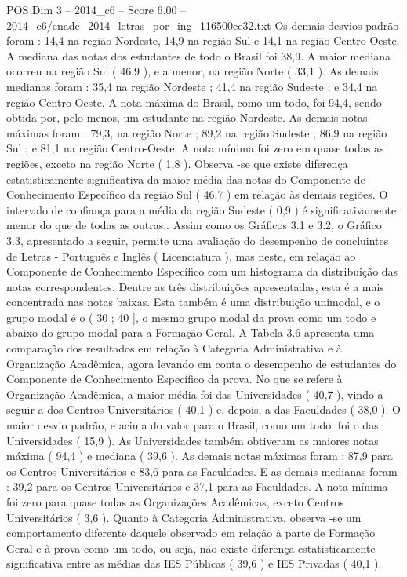 \begin{textsample}{POS Dim 3 – 2014\_c6 – Score 6.00 – 2014\_c6/enade\_2014\_letras\_por\_ing\_116500ce32.txt}
Os demais desvios padrão foram : 14,4 na região Nordeste, 14,9 na região Sul e 14,1 na região Centro-Oeste.
A mediana das notas dos estudantes de todo o Brasil foi 38,9.
A maior mediana ocorreu na região Sul ( 46,9 ), e a menor, na região Norte ( 33,1 ).
As demais medianas foram : 35,4 na região Nordeste ; 41,4 na região Sudeste ; e 34,4 na região Centro-Oeste.
A nota máxima do Brasil, como um todo, foi 94,4, sendo obtida por, pelo menos, um estudante na região Nordeste.
As demais notas máximas foram : 79,3, na região Norte ; 89,2 na região Sudeste ; 86,9 na região Sul ; e 81,1 na região Centro-Oeste.
A nota mínima foi zero em quase todas as regiões, exceto na região Norte ( 1,8 ).
Observa -se que existe diferença estatisticamente significativa da maior média das notas do Componente de Conhecimento Específico da região Sul ( 46,7 ) em relação às demais regiões.
O intervalo de confiança para a média da região Sudeste ( 0,9 ) é significativamente menor do que de todas as outras..
Assim como os Gráficos 3.1 e 3.2, o Gráfico 3.3, apresentado a seguir, permite uma avaliação do desempenho de concluintes de Letras - Português e Inglês ( Licenciatura ), mas neste, em relação ao Componente de Conhecimento Específico com um histograma da distribuição das notas correspondentes.
Dentre as três distribuições apresentadas, esta é a mais concentrada nas notas baixas.
Esta também é uma distribuição unimodal, e o grupo modal é o ( 30 ; 40 ], o mesmo grupo modal da prova como um todo e abaixo do grupo modal para a Formação Geral.
A Tabela 3.6 apresenta uma comparação dos resultados em relação à Categoria Administrativa e à Organização Acadêmica, agora levando em conta o desempenho de estudantes do Componente de Conhecimento Específico da prova.
No que se refere à Organização Acadêmica, a maior média foi das Universidades ( 40,7 ), vindo a seguir a dos Centros Universitários ( 40,1 ) e, depois, a das Faculdades ( 38,0 ).
O maior desvio padrão, e acima do valor para o Brasil, como um todo, foi o das Universidades ( 15,9 ).
As Universidades também obtiveram as maiores notas máxima ( 94,4 ) e mediana ( 39,6 ).
As demais notas máximas foram : 87,9 para os Centros Universitários e 83,6 para as Faculdades.
E as demais medianas foram : 39,2 para os Centros Universitários e 37,1 para as Faculdades.
A nota mínima foi zero para quase todas as Organizações Acadêmicas, exceto Centros Universitários ( 3,6 ).
Quanto à Categoria Administrativa, observa -se um comportamento diferente daquele observado em relação à parte de Formação Geral e à prova como um todo, ou seja, não existe diferença estatisticamente significativa entre as médias das IES Públicas ( 39,6 ) e IES Privadas ( 40,1 ).

\end{textsample}
